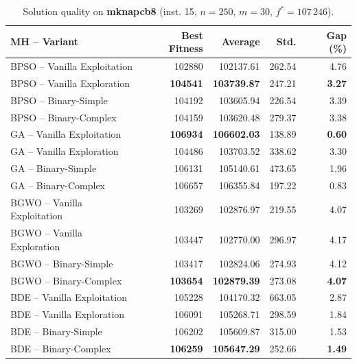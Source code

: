 \begin{table}[htbp]
  \centering
  \small
  \caption{Solution quality on \textbf{mknapcb8} (inst. 15, $n=250$, $m=30$, $f^*=107\,246$).}
  \label{tab:calidad_mknapcb8_15}
  \begin{tabular}{lrrrr}
    \toprule
    \textbf{MH -- Variant} &
    \textbf{Best Fitness} &
    \textbf{Average} &
    \textbf{Std.} &
    \textbf{Gap (\%)} \\
    \midrule
    BPSO -- Vanilla Exploitation &         102880 &        102137.61 & 262.54 &         4.76 \\
    BPSO -- Vanilla Exploration  & \textbf{104541} & \textbf{103739.87} & 247.21 & \textbf{3.27} \\
    BPSO -- Binary-Simple        &         104192 &        103605.94 & 226.54 &         3.39 \\
    BPSO -- Binary-Complex       &         104159 &        103620.48 & 279.37 &         3.38 \\
    \midrule
    GA -- Vanilla Exploitation   & \textbf{106934} & \textbf{106602.03} & 138.89 & \textbf{0.60} \\
    GA -- Vanilla Exploration    &         104486 &        103703.52 & 338.62 &         3.30 \\
    GA -- Binary-Simple          &         106131 &        105140.61 & 473.65 &         1.96 \\
    GA -- Binary-Complex         &         106657 &        106355.84 & 197.22 &         0.83 \\
    \midrule
    BGWO -- Vanilla Exploitation &         103269 &        102876.97 & 219.55 &         4.07 \\
    BGWO -- Vanilla Exploration  &         103447 &        102770.00 & 296.97 &         4.17 \\
    BGWO -- Binary-Simple        &         103417 &        102824.06 & 274.93 &         4.12 \\
    BGWO -- Binary-Complex       & \textbf{103654} & \textbf{102879.39} & 273.08 & \textbf{4.07} \\
    \midrule
    BDE -- Vanilla Exploitation  &         105228 &        104170.32 & 663.05 &         2.87 \\
    BDE -- Vanilla Exploration   &         106091 &        105268.71 & 298.59 &         1.84 \\
    BDE -- Binary-Simple         &         106202 &        105609.87 & 315.00 &         1.53 \\
    BDE -- Binary-Complex        & \textbf{106259} & \textbf{105647.29} & 252.66 & \textbf{1.49} \\
    \bottomrule
  \end{tabular}
\end{table}
